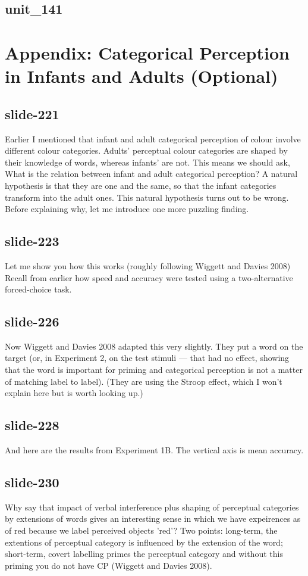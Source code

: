\documentclass[12pt,\papersize]{extarticle}
\begin{document}
 
\subsection{unit\_141}
 
\section{Appendix: Categorical Perception in Infants and Adults (Optional)}
 
 
\subsection{slide-221}
Earlier I mentioned that infant and adult categorical perception of colour involve different colour categories.
Adults’ perceptual colour categories are shaped by their knowledge of words, whereas infants’ are not.
This means we should ask, What is the relation between infant and adult categorical perception?
A natural hypothesis is that they are one and the same, so that the infant categories transform into the adult ones.
This natural hypothesis turns out to be wrong.
Before explaining why, let me introduce one more puzzling finding.
 
 
\subsection{slide-223}
Let me show you how this works (roughly following Wiggett and Davies 2008)
Recall from earlier how speed and accuracy were tested using a two-alternative forced-choice task.
 
 
\subsection{slide-226}
Now Wiggett and Davies 2008 adapted this very slightly.
They put a word on the target (or, in Experiment 2, on the test stimuli --- that had no effect, showing that the word is important for priming and categorical perception is not a matter of matching label to label).
(They are using the Stroop effect, which I won't explain here but is worth looking up.)
 
 
\subsection{slide-228}
And here are the results from Experiment 1B. The vertical axis is mean accuracy.
 
 
\subsection{slide-230}
Why say that impact of verbal interference plus shaping of perceptual categories by extensions of words gives an interesting sense in which we have expeirences as of red because we label perceived objects 'red'? Two points: long-term, the extentions of perceptual category is influenced by the extension of the word; short-term, covert labelling primes the perceptual category and without this priming you do not have CP (Wiggett and Davies 2008).
 
\end{document}
